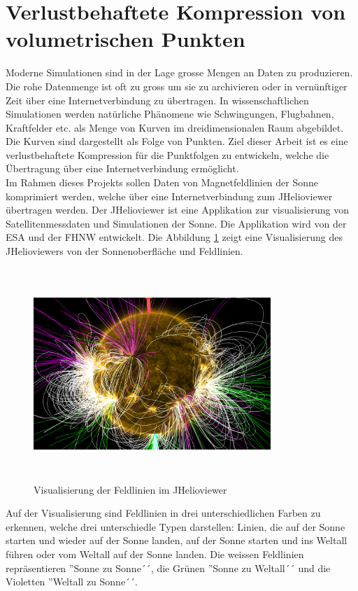 \section{Verlustbehaftete Kompression von volumetrischen Punkten}\label{einleitung}
Moderne Simulationen sind in der Lage grosse Mengen an Daten zu produzieren. Die rohe Datenmenge ist oft zu gross um sie zu archivieren oder in vernünftiger Zeit über eine Internetverbindung zu übertragen. In wissenschaftlichen Simulationen werden natürliche Phänomene wie Schwingungen, Flugbahnen, Kraftfelder etc. als Menge von Kurven im dreidimensionalen Raum abgebildet. Die Kurven sind dargestellt als Folge von Punkten. Ziel dieser Arbeit ist es eine verlustbehaftete Kompression für die Punktfolgen zu entwickeln, welche die Übertragung über eine Internetverbindung ermöglicht.\\
[\baselineskip]
Im Rahmen dieses Projekts sollen Daten von Magnetfeldlinien der Sonne komprimiert werden, welche über eine Internetverbindung zum JHelioviewer übertragen werden. Der JHelioviewer ist eine Applikation zur visualisierung von Satellitenmessdaten und Simulationen der Sonne. Die Applikation wird von der ESA und der FHNW entwickelt. Die Abbildung \ref{einleitung::feldlinien} zeigt eine Visualisierung des JHelioviewers von der Sonnenoberfläche und Feldlinien.\\
\begin{figure}[!htbp]
\center
	\includegraphics[width=0.8\textwidth,height=8cm,keepaspectratio]{./pictures/einleitung/fieldLines.png}
	\caption{Visualisierung der Feldlinien im JHelioviewer}
	\label{einleitung::feldlinien}
\end{figure}
Auf der Visualisierung sind Feldlinien in drei unterschiedlichen Farben zu erkennen, welche drei unterschiedle Typen darstellen: Linien, die auf der Sonne starten und wieder auf der Sonne landen, auf der Sonne starten und ins Weltall führen oder vom Weltall auf der Sonne landen. Die weissen Feldlinien repräsentieren ''Sonne zu Sonne´´, die Grünen ''Sonne zu Weltall´´ und die Violetten ''Weltall zu Sonne´´.\\
